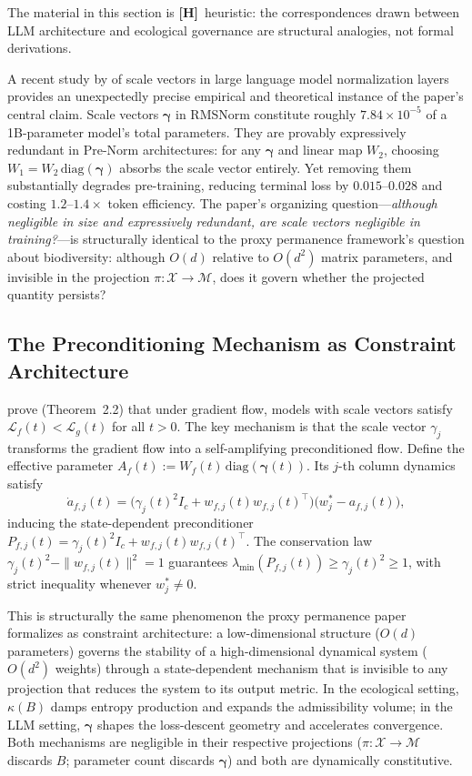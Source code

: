 \documentclass[12pt]{article}
\begin{document}
The material in this section is \textbf{[H]}~heuristic: the correspondences drawn
between LLM architecture and ecological governance are structural analogies, not formal
derivations.

A recent study by \citet{Wang2026} of scale vectors in large language model normalization
layers provides an unexpectedly precise empirical and theoretical instance of the paper's
central claim. Scale vectors $\boldsymbol{\gamma}$ in RMSNorm constitute roughly
$7.84\times 10^{-5}$ of a 1B-parameter model's total parameters. They are provably
expressively redundant in Pre-Norm architectures: for any $\boldsymbol{\gamma}$ and
linear map $W_2$, choosing $W_1 = W_2\,\mathrm{diag}(\boldsymbol{\gamma})$ absorbs the
scale vector entirely. Yet removing them substantially degrades pre-training, reducing
terminal loss by $0.015$--$0.028$ and costing $1.2$--$1.4\times$ token efficiency. The
paper's organizing question---\emph{although negligible in size and expressively
redundant, are scale vectors negligible in training?}---is structurally identical to the
proxy permanence framework's question about biodiversity: although $O(d)$ relative to
$O(d^2)$ matrix parameters, and invisible in the projection $\pi:\mathcal{X}\to\mathcal{M}$,
does it govern whether the projected quantity persists?

\subsection{The Preconditioning Mechanism as Constraint Architecture}

\citet{Wang2026} prove (Theorem~2.2) that under gradient flow, models with scale vectors
satisfy $\mathcal{L}_f(t) < \mathcal{L}_g(t)$ for all $t > 0$. The key mechanism is that
the scale vector $\gamma_j$ transforms the gradient flow into a self-amplifying preconditioned
flow. Define the effective parameter $A_f(t) := W_f(t)\,\mathrm{diag}(\boldsymbol{\gamma}(t))$.
Its $j$-th column dynamics satisfy
\begin{equation}
\dot{a}_{f,j}(t)
= \bigl(\gamma_j(t)^2 I_c + w_{f,j}(t)w_{f,j}(t)^\top\bigr)
\bigl(w^*_j - a_{f,j}(t)\bigr),
\end{equation}
inducing the state-dependent preconditioner
$P_{f,j}(t) = \gamma_j(t)^2 I_c + w_{f,j}(t)w_{f,j}(t)^\top$.
The conservation law $\gamma_j(t)^2 - \|w_{f,j}(t)\|^2 = 1$ guarantees
$\lambda_{\min}(P_{f,j}(t)) \geq \gamma_j(t)^2 \geq 1$, with strict inequality whenever
$w^*_j \neq 0$.

This is structurally the same phenomenon the proxy permanence paper formalizes as
constraint architecture: a low-dimensional structure ($O(d)$ parameters) governs the
stability of a high-dimensional dynamical system ($O(d^2)$ weights) through a
state-dependent mechanism that is invisible to any projection that reduces the system
to its output metric. In the ecological setting, $\kappa(B)$ damps entropy production
and expands the admissibility volume; in the LLM setting, $\boldsymbol{\gamma}$ shapes
the loss-descent geometry and accelerates convergence. Both mechanisms are negligible
in their respective projections ($\pi:\mathcal{X}\to\mathcal{M}$ discards $B$; parameter
count discards $\boldsymbol{\gamma}$) and both are dynamically constitutive.
\end{document}
